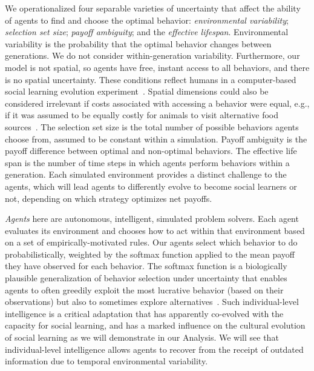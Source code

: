 \documentclass[letterpaper,11.5pt]{scrartcl}
\begin{document}
We operationalized four separable varieties of uncertainty that affect the
ability of agents to find and choose the optimal behavior: 
\emph{environmental variability}; 
\emph{selection set size}; \emph{payoff ambiguity}; and the \emph{effective lifespan}. 
Environmental variability is the probability that the optimal behavior changes
between generations. We do not consider within-generation variability. 
Furthermore, our model is not spatial, so agents have free, instant
access to all behaviors, and there is no spatial uncertainty. 
These conditions reflect humans in a computer-based social learning evolution
experiment~\cite{McElreath2005,Morgan2012,Derex2016}. Spatial dimensions could also be
considered irrelevant if costs associated with accessing a behavior were equal,
e.g., if it was assumed to be equally costly for animals to
visit alternative food sources~\cite{Aplin2017,Baracchi2018}.  
The selection set size is the total number of possible
behaviors agents choose from, assumed to be constant within a simulation.  
Payoff ambiguity is the payoff difference between optimal
and non-optimal behaviors. The effective life span is the
number of time steps in which agents perform behaviors within a generation. 
Each simulated environment provides a distinct challenge
to the agents, which will lead agents to differently evolve to become social
learners or not, depending on which strategy optimizes net payoffs.

\emph{Agents} here are autonomous, intelligent, simulated problem solvers. Each
agent evaluates its environment and chooses how to act within that environment based
on a set of empirically-motivated rules.  Our agents select which behavior to do
probabilistically, weighted by the softmax function applied to the mean payoff they
have observed for each behavior. The softmax function is a biologically plausible
generalization of behavior selection under uncertainty that enables agents to often
greedily exploit the most lucrative behavior (based on their observations) but also
to sometimes explore alternatives~\cite{Schulz2019,Collins2013,Daw2006,Yechiam2005}.
Such individual-level intelligence is a critical adaptation that has apparently
co-evolved with the capacity for social learning, and has a marked influence on the
cultural evolution of social learning as we will demonstrate in our Analysis.
We will see that individual-level intelligence allows agents to recover from
the receipt of outdated information due to temporal environmental variability.
\end{document}
